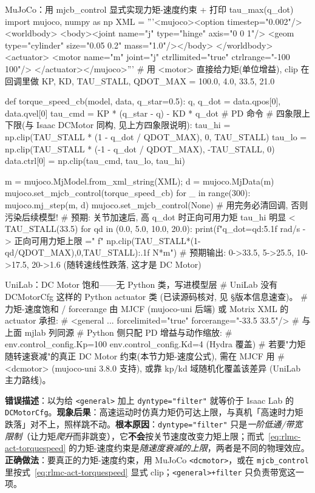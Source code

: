 \begin{codebox}[Python]{MuJoCo：用 mjcb\_control 显式实现力矩-速度约束 + 打印 tau\_max(q\_dot)}
import mujoco, numpy as np
XML = '''<mujoco><option timestep="0.002"/><worldbody>
  <body><joint name="j" type="hinge" axis="0 0 1"/>
  <geom type="cylinder" size="0.05 0.2" mass="1.0"/></body>
  </worldbody><actuator>
  <motor name="m" joint="j" ctrllimited="true" ctrlrange="-100 100"/>
  </actuator></mujoco>'''                       # 用 <motor> 直接给力矩(单位增益), clip 在回调里做
KP, KD, TAU_STALL, QDOT_MAX = 100.0, 4.0, 33.5, 21.0

def torque_speed_cb(model, data, q_star=0.5):
    q, q_dot = data.qpos[0], data.qvel[0]
    tau_cmd = KP * (q_star - q) - KD * q_dot      # PD 命令
    # 四象限上下限(与 Isaac DCMotor 同构, 见上方四象限说明):
    tau_hi = np.clip(TAU_STALL * (1 - q_dot / QDOT_MAX),  0, TAU_STALL)
    tau_lo = np.clip(TAU_STALL * (-1 - q_dot / QDOT_MAX), -TAU_STALL, 0)
    data.ctrl[0] = np.clip(tau_cmd, tau_lo, tau_hi)

m = mujoco.MjModel.from_xml_string(XML); d = mujoco.MjData(m)
mujoco.set_mjcb_control(torque_speed_cb)
for _ in range(300): mujoco.mj_step(m, d)
mujoco.set_mjcb_control(None)                     # 用完务必清回调, 否则污染后续模型!
# 预期: 关节加速后, 高 q_dot 时正向可用力矩 tau_hi 明显 < TAU_STALL(33.5)
for qd in (0.0, 5.0, 10.0, 20.0):
    print(f"q_dot={qd:5.1f} rad/s -> 正向可用力矩上限 ="
          f" {np.clip(TAU_STALL*(1-qd/QDOT_MAX),0,TAU_STALL):.1f} N*m")
# 预期输出: 0->33.5, 5->25.5, 10->17.5, 20->1.6  (随转速线性跌落, 这才是 DC Motor)
\end{codebox}

\begin{codebox}[Python]{UniLab：DC Motor 饱和——无 Python 类，写进模型层}
# UniLab 没有 DCMotorCfg 这样的 Python actuator 类 (已读源码核对, 见 §版本信息速查)。
# 力矩-速度饱和 / forcerange 由 MJCF (mujoco-uni 后端) 或 Motrix XML 的 actuator 承担:
#   <general ... forcelimited="true" forcerange="-33.5 33.5"/>   # 与上面 mjlab 列同源
# Python 侧只配 PD 增益与动作缩放:
#   env.control_config.Kp=100  env.control_config.Kd=4  (Hydra 覆盖)
# 若要"力矩随转速衰减"的真正 DC Motor 约束(本节力矩-速度公式), 需在 MJCF 用
#   <dcmotor> (mujoco-uni 3.8.0 支持), 或靠 kp/kd 域随机化覆盖该差异 (UniLab 主力路线)。
\end{codebox}

\begin{pitfall}[把 \texttt{dyntype="filter"} 当成 DC Motor 的力矩-速度约束]
\textbf{错误描述}：以为给 \verb|<general>| 加上 \verb|dyntype="filter"| 就等价于 Isaac Lab 的 \verb|DCMotorCfg|。\textbf{现象后果}：高速运动时仿真力矩仍可达上限，与真机「高速时力矩跌落」对不上，照样跳不动。\textbf{根本原因}：\verb|dyntype="filter"| 只是\emph{一阶低通/带宽限制}（让力矩\emph{爬升}而非跳变），它\textbf{不会}按关节速度改变力矩上限；而式~\eqref{eq:rlmc-act-torquespeed} 的力矩-速度约束是\emph{随速度衰减的上限}，两者是不同的物理效应。\textbf{正确做法}：要真正的力矩-速度约束，用 MuJoCo \verb|<dcmotor>|，或在 \verb|mjcb_control| 里按式~\eqref{eq:rlmc-act-torquespeed} 显式 clip；\verb|<general>+filter| 只负责带宽这一项。
\end{pitfall}

